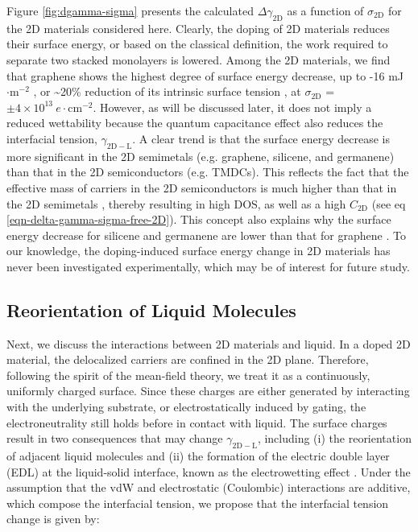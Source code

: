 \documentclass[journal=jacsat,manuscript=article,email=true]{achemso}
\begin{document}
Figure \ref{fig:dgamma-sigma} presents the calculated \(\Delta
\gamma_{\mathrm{2D}}\) as a function of \(\sigma_{\mathrm{2D}}\) for the
2D materials considered here. Clearly, the doping of 2D materials
reduces their surface energy, or based on the classical definition,
the work required to separate two stacked monolayers is lowered. Among
the 2D materials, we find that graphene shows the highest degree of
surface energy decrease, up to -16 mJ\(\cdot \mathrm{m}^{-2}\) , or
\textasciitilde{}20\% reduction of its intrinsic surface tension
\cite{shih_wetting_2013}, at \(\sigma_{\mathrm{2D}}\) = \(\pm
4\times10^{13}\ e\cdot \mathrm{cm}^{-2}\). However, as will be
discussed later, it does not imply a reduced wettability because the
quantum capacitance effect also reduces the interfacial tension,
\(\gamma_{\mathrm{2D-L}}\). A clear trend is that the surface energy
decrease is more significant in the 2D semimetals (e.g. graphene,
silicene, and germanene) than that in the 2D semiconductors
(e.g. TMDCs). This reflects the fact that the effective mass of
carriers in the 2D semiconductors is much higher than that in the 2D
semimetals \cite{davies_two-dimensional_1997}, thereby resulting in
high DOS, as well as a high \(C_{\mathrm{2D}}\) (see eq
\ref{eqn-delta-gamma-sigma-free-2D}). This concept also explains why the
surface energy decrease for silicene and germanene are lower than
that for graphene \cite{Yan_2013}.  To our knowledge, the doping-induced
surface energy change in 2D materials has never been investigated
experimentally, which may be of interest for future study.


\subsection{Reorientation of Liquid Molecules}
\label{sec:org188528c}

Next, we discuss the interactions between 2D materials and liquid. In
a doped 2D material, the delocalized carriers are confined in the 2D
plane. Therefore, following the spirit of the mean-field theory, we
treat it as a continuously, uniformly charged surface. Since these
charges are either generated by interacting with the underlying
substrate, or electrostatically induced by gating, the
electroneutrality still holds before in contact with liquid. The
surface charges result in two consequences that may change
\(\gamma_{\mathrm{2D-L}}\), including (i) the reorientation of adjacent
liquid molecules \cite{ostrowski_tunable_2014} and (ii) the formation of
the electric double layer (EDL) at the liquid-solid interface, known
as the electrowetting effect
\cite{Lippmann_1908,mugele_electrowetting:_2005}. Under the assumption
that the vdW and electrostatic (Coulombic) interactions are additive,
which compose the interfacial tension, we propose that the
interfacial tension change is given by:
\end{document}
